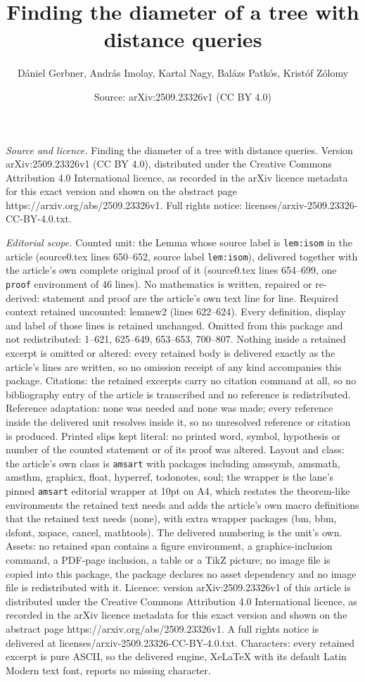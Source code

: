 \documentclass[10pt,a4paper]{amsart}
\title[Finding the diameter of a tree with distance queries]{Finding the diameter of a tree with distance queries}
\author{D\'aniel Gerbner, Andr\'as Imolay, Kartal Nagy, Bal\'azs Patk\'os, Krist\'of Z\'olomy}
\date{Source: arXiv:2509.23326v1 (CC BY 4.0)}
\begin{document}
\maketitle

\noindent\emph{Source and licence.} Finding the diameter of a tree with distance queries. Version arXiv:2509.23326v1 (CC BY 4.0), distributed under the Creative Commons Attribution 4.0 International licence, as recorded in the arXiv licence metadata for this exact version and shown on the abstract page https://arxiv.org/abs/2509.23326v1. Full rights notice: licenses/arxiv-2509.23326-CC-BY-4.0.txt.\par\smallskip

\noindent\textit{Editorial scope.} Counted unit: the Lemma whose source label is \texttt{lem:isom} in the article (source0.tex lines 650--652, source label \texttt{lem:isom}), delivered together with the article's own complete original proof of it (source0.tex lines 654--699, one \texttt{proof} environment of 46 lines). No mathematics is written, repaired or re-derived: statement and proof are the article's own text line for line. Required context retained uncounted: lemnew2 (lines 622--624). Every definition, display and label of those lines is retained unchanged. Omitted from this package and not redistributed: 1--621, 625--649, 653--653, 700--807. Nothing inside a retained excerpt is omitted or altered: every retained body is delivered exactly as the article's lines are written, so no omission receipt of any kind accompanies this package. Citations: the retained excerpts carry no citation command at all, so no bibliography entry of the article is transcribed and no reference is redistributed. Reference adaptation: none was needed and none was made; every reference inside the delivered unit resolves inside it, so no unresolved reference or citation is produced. Printed slips kept literal: no printed word, symbol, hypothesis or number of the counted statement or of its proof was altered. Layout and class: the article's own class is \texttt{amsart} with packages including amssymb, amsmath, amsthm, graphicx, float, hyperref, todonotes, soul; the wrapper is the lane's pinned \texttt{amsart} editorial wrapper at 10pt on A4, which restates the theorem-like environments the retained text needs and adds the article's own macro definitions that the retained text needs (none), with extra wrapper packages (bm, bbm, dsfont, xspace, cancel, mathtools). The delivered numbering is the unit's own. Assets: no retained span contains a figure environment, a graphics-inclusion command, a PDF-page inclusion, a table or a TikZ picture; no image file is copied into this package, the package declares no asset dependency and no image file is redistributed with it. Licence: version arXiv:2509.23326v1 of this article is distributed under the Creative Commons Attribution 4.0 International licence, as recorded in the arXiv licence metadata for this exact version and shown on the abstract page https://arxiv.org/abs/2509.23326v1. A full rights notice is delivered at licenses/arxiv-2509.23326-CC-BY-4.0.txt. Characters: every retained excerpt is pure ASCII, so the delivered engine, XeLaTeX with its default Latin Modern text font, reports no missing character.
\end{document}

